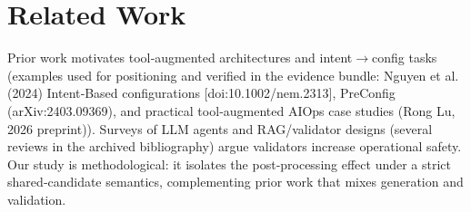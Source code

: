 \documentclass[conference]{IEEEtran}
\begin{document}
\section{Related Work}
Prior work motivates tool‑augmented architectures and intent\ensuremath{\rightarrow}config tasks (examples used for positioning and verified in the evidence bundle: Nguyen et al. (2024) Intent‑Based configurations [doi:10.1002/nem.2313], PreConfig (arXiv:2403.09369), and practical tool‑augmented AIOps case studies (Rong Lu, 2026 preprint)). Surveys of LLM agents and RAG/validator designs (several reviews in the archived bibliography) argue validators increase operational safety. Our study is methodological: it isolates the post‑processing effect under a strict shared‑candidate semantics, complementing prior work that mixes generation and validation.
\end{document}
